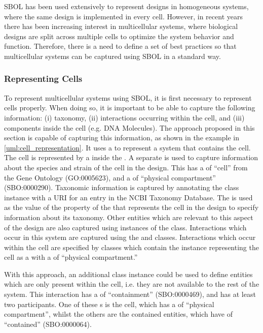 SBOL has been used extensively to represent designs in homogeneous systems, where the same design is implemented in every cell. However, in recent years there has been increasing interest in multicellular systems, where biological designs are split across multiple cells to optimize the system behavior and function. Therefore, there is a need to define a set of best practices so that multicellular systems can be captured using SBOL in a standard way.

\subsubsection{Representing Cells}

To represent multicellular systems using SBOL, it is first necessary to represent cells properly. 
When doing so, it is important to be able to capture the following information: (i) taxonomy, (ii) interactions occurring within the cell, and (iii) components inside the cell (e.g. DNA Molecules). 
The approach proposed in this section is capable of capturing this information, as shown in the example in \ref{uml:cell_representation}. 
It uses a  to represent a system that contains the cell. 
The cell is represented by a  inside the . 
A separate  is used to capture information about the species and strain of the cell in the design. 
This  has a  of ``cell'' from the Gene Ontology (GO:0005623), and a  of ``physical compartment'' (SBO:0000290).
Taxonomic information is captured by annotating the class instance with a URI for an entry in the NCBI Taxonomy Database. 
The  is used as the value of the  property of the  that represents the cell in the design to specify information about its taxonomy. 
Other entities which are relevant to this aspect of the design are also captured using instances of the  class. 
Interactions which occur in this system are captured using the  and  classes. 
Interactions which occur within the cell are specified by  classes which contain the  instance representing the cell as a  with a  of ``physical compartment.''

With this approach, an additional  class instance could be used to define entities which are only present within the cell, i.e. they are not available to the rest of the system. 
This interaction has a  of ``containment'' (SBO:0000469), and has at least two participants. 
One of these s is the cell, which has a  of ``physical compartment'', whilst the others are the contained entities, which have  of ``contained''
(SBO:0000064).

